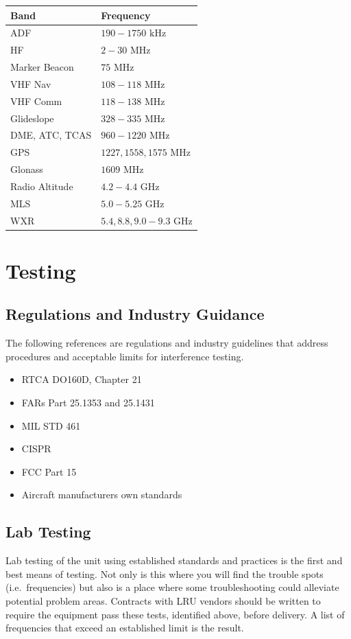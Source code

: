 \documentclass[
]{book}
\providecommand{\tightlist}{%
  \setlength{\itemsep}{0pt}\setlength{\parskip}{0pt}}
\begin{document}
\begin{longtable}[]{@{}ll@{}}
\toprule
\textbf{Band} & \textbf{Frequency}\tabularnewline
\midrule
\endhead
ADF & \(190-1750 \text{ kHz}\)\tabularnewline
HF & \(2-30 \text{ MHz}\)\tabularnewline
Marker Beacon & \(75 \text{ MHz}\)\tabularnewline
VHF Nav & \(108-118 \text{ MHz}\)\tabularnewline
VHF Comm & \(118-138 \text{ MHz}\)\tabularnewline
Glideslope & \(328-335 \text{ MHz}\)\tabularnewline
DME, ATC, TCAS & \(960-1220 \text{ MHz}\)\tabularnewline
GPS & \(1227, 1558, 1575 \text{ MHz}\)\tabularnewline
Glonass & \(1609 \text{ MHz}\)\tabularnewline
Radio Altitude & \(4.2-4.4 \text{ GHz}\)\tabularnewline
MLS & \(5.0-5.25 \text{ GHz}\)\tabularnewline
WXR & \(5.4, 8.8, 9.0-9.3 \text{ GHz}\)\tabularnewline
\bottomrule
\end{longtable}

\hypertarget{testing}{%
\section{Testing}\label{testing}}

\hypertarget{regulations-and-industry-guidance}{%
\subsection{Regulations and Industry Guidance}\label{regulations-and-industry-guidance}}

The following references are regulations and industry guidelines that address
procedures and acceptable limits for interference testing.

\begin{itemize}
\tightlist
\item
  RTCA DO160D, Chapter 21
\item
  FARs Part 25.1353 and 25.1431
\item
  MIL STD 461
\item
  CISPR
\item
  FCC Part 15
\item
  Aircraft manufacturers own standards
\end{itemize}

\hypertarget{lab-testing}{%
\subsection{Lab Testing}\label{lab-testing}}

Lab testing of the unit using established standards and practices is the first
and best means of testing. Not only is this where you will find the trouble
spots (i.e.~frequencies) but also is a place where some troubleshooting could
alleviate potential problem areas. Contracts with LRU vendors should be written
to require the equipment pass these tests, identified above, before delivery. A
list of frequencies that exceed an established limit is the result.
\end{document}

